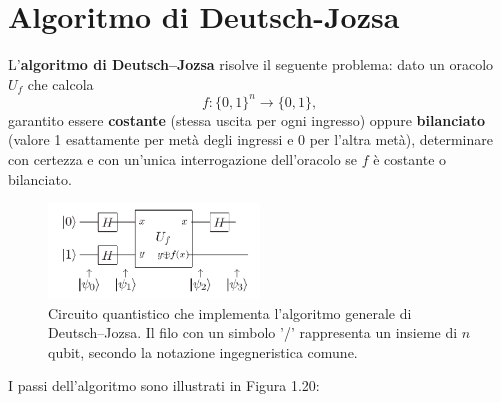 \documentclass[a4paper,12pt]{report}
\theoremstyle{plain}
\begin{document}
\section{Algoritmo di Deutsch-Jozsa}
L'\textbf{algoritmo di Deutsch--Jozsa} risolve il seguente problema: dato un oracolo $U_f$ che calcola
\[
f\colon\{0,1\}^n \to \{0,1\},
\]
garantito essere \textbf{costante} (stessa uscita per ogni ingresso) oppure \textbf{bilanciato} (valore 1 esattamente per metà degli ingressi e 0 per l'altra metà), determinare con certezza e con un'unica interrogazione dell'oracolo se $f$ è costante o bilanciato.
\begin{figure}[H]
    \centering
    \includegraphics[width=0.5\textwidth]{Immagine18.png} 
    \caption{Circuito quantistico che implementa l'algoritmo generale di Deutsch–Jozsa. Il filo con un simbolo '/' rappresenta un insieme di \( n \) qubit, secondo la notazione ingegneristica comune.}
    \label{Immagine18}
\end{figure}
I passi dell'algoritmo sono illustrati in Figura 1.20:
\end{document}
